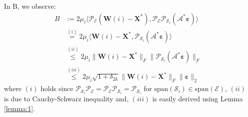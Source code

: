 \documentclass[twocolumn]{svjour3}
\newcommand{\vectornormbig}[1]{\big\|#1\big\|}
\newcommand{\sensing}{\boldsymbol{\mathcal{A}}}
\newcommand{\bestsignal}{\boldsymbol{X}^\ast}
\newcommand{\noise}{\boldsymbol{\varepsilon}}
\newcommand{\rank}{k}
\begin{document}
In B, we observe:
\begin{align}
B &:= 2\mu_i\langle \mathcal{P}_{\mathcal{E}}(\boldsymbol{W}(i) - \bestsignal), \mathcal{P}_{\mathcal{E}}\mathcal{P}_{\mathcal{S}_i}(\sensing^\ast \noise) \rangle \nonumber \\ &\stackrel{(i)}{=} 2\mu_i\langle \boldsymbol{W}(i) - \bestsignal, \mathcal{P}_{\mathcal{S}_i}(\sensing^\ast \noise) \rangle \nonumber \\
&\stackrel{(ii)}{\leq} 2\mu_i \vectornormbig{\boldsymbol{W}(i) - \bestsignal}_F \vectornormbig{\mathcal{P}_{\mathcal{S}_i}(\sensing^\ast \noise)}_F \nonumber \\
&\stackrel{(iii)}{\leq} 2\mu_i \sqrt{1+\delta_{2\rank}}\vectornormbig{\boldsymbol{W}(i) - \bestsignal}_F \vectornormbig{\noise}_2 \label{eq:mALPS0:02}
\end{align} where $ (i) $ holds since $ \mathcal{P}_{\mathcal{S}_i} \mathcal{P}_{\mathcal{E}} = \mathcal{P}_{\mathcal{E}}\mathcal{P}_{\mathcal{S}_i} = \mathcal{P}_{\mathcal{S}_i} $ for $ \text{span}(\mathcal{S}_i) \in \text{span}(\mathcal{E}) $, $ (ii) $ is due to Cauchy-Schwarz inequality and, $ (iii) $ is easily derived using Lemma \ref{lemma:1}.
\end{document}

